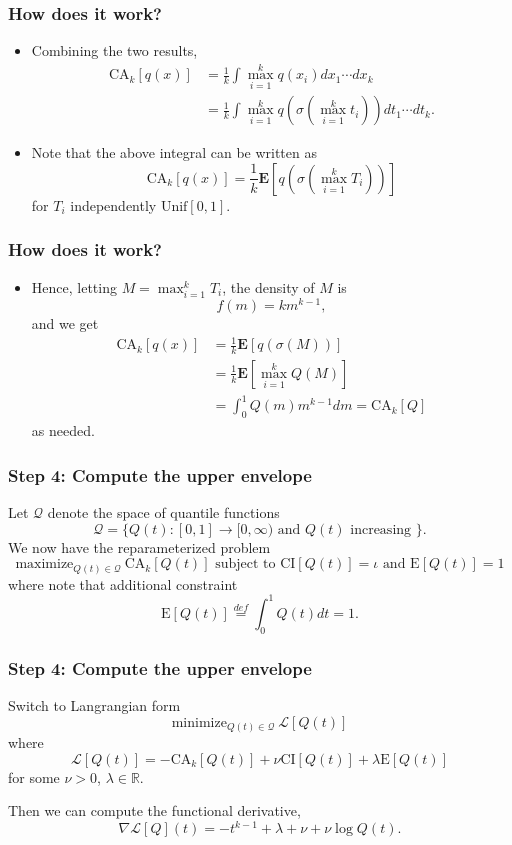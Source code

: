 \documentclass{beamer}
\newcommand{\E}{\textbf{E}}
\begin{document}
\begin{frame}
\frametitle{How does it work?}
\begin{itemize}
\item Combining the two results,
\begin{align*}
\text{CA}_k[q(x)] &= \frac{1}{k}\int \max_{i=1}^k q(x_i) dx_1 \cdots dx_k 
\\&= \frac{1}{k}\int \max_{i=1}^k q(\sigma(\max_{i=1}^k t_i)) dt_1 \cdots dt_k.
\end{align*}
\item Note that the above integral can be written as
\[
\text{CA}_k[q(x)] = \frac{1}{k}\E[q(\sigma(\max_{i=1}^k T_i))]
\]
for $T_i$ independently $\text{Unif}[0,1]$.
\end{itemize}
\end{frame}

\begin{frame}
\frametitle{How does it work?}
\begin{itemize}
\item Hence, letting $M = \max_{i=1}^k T_i$, the density of $M$ is
\[
f(m) = k m^{k-1},
\]
and we get
\begin{align*}
\text{CA}_k[q(x)] &= \frac{1}{k}\E[q(\sigma(M))]
\\&= \frac{1}{k}\E[\max_{i=1}^k Q(M)]
\\&= \int_0^1 Q(m) m^{k-1}dm  = \text{CA}_k[Q]
\end{align*}
as needed.
\end{itemize}
\end{frame}

\begin{frame}
\frametitle{Step 4: Compute the upper envelope}
Let $\mathcal{Q}$ denote the space of quantile functions 
\[\mathcal{Q} = \{Q(t): [0,1] \to [0,\infty)\text{ and }Q(t)\text{ increasing }\}.\]
We now have the reparameterized problem
\[
\text{maximize}_{Q(t) \in \mathcal{Q}}\ \text{CA}_k[Q(t)] \text{ subject to }\text{CI}[Q(t)] = \iota\text{ and }\text{E}[Q(t)] = 1
\]
where note that additional constraint
\[
\text{E}[Q(t)] \stackrel{def}{=} \int_0^1 Q(t) dt = 1.
\]
\end{frame}

\begin{frame}
\frametitle{Step 4: Compute the upper envelope}
Switch to Langrangian form
\[
\text{minimize}_{Q(t) \in \mathcal{Q}}\ \mathcal{L}[Q(t)]
\]
where
\[
\mathcal{L}[Q(t)] = -\text{CA}_k[Q(t)] + \nu \text{CI}[Q(t)] + \lambda \text{E}[Q(t)]
\]
for some $\nu > 0$, $\lambda \in \mathbb{R}$.

Then we can compute the functional derivative,
\[
\nabla \mathcal{L}[Q](t) = -t^{k-1} + \lambda + \nu + \nu \log Q(t).
\]
\end{frame}
\end{document}
